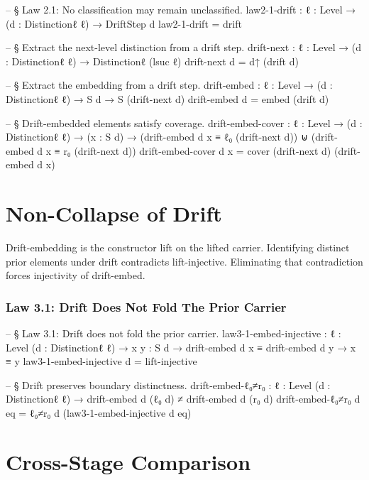 \documentclass[11pt,a4paper]{book}
\def\texttt#1{#1}%
\begin{document}
\begin{code}
-- § Law 2.1: No classification may remain unclassified.
law2-1-drift : {ℓ : Level} → (d : Distinctionℓ ℓ) → DriftStep d
law2-1-drift = drift

-- § Extract the next-level distinction from a drift step.
drift-next : {ℓ : Level} → (d : Distinctionℓ ℓ) → Distinctionℓ (lsuc ℓ)
drift-next d = d↑ (drift d)

-- § Extract the embedding from a drift step.
drift-embed : {ℓ : Level} → (d : Distinctionℓ ℓ) → S d → S (drift-next d)
drift-embed d = embed (drift d)

-- § Drift-embedded elements satisfy coverage.
drift-embed-cover : {ℓ : Level} → (d : Distinctionℓ ℓ) → (x : S d)
                 → (drift-embed d x ≡ ℓ₀ (drift-next d)) ⊎ (drift-embed d x ≡ r₀ (drift-next d))
drift-embed-cover d x = cover (drift-next d) (drift-embed d x)
\end{code}

\chapter{Non-Collapse of Drift}

Drift-embedding is the constructor \texttt{lift} on the lifted carrier. Identifying distinct prior elements under drift contradicts \texttt{lift-injective}. Eliminating that contradiction forces injectivity of \texttt{drift-embed}.

\subsection{Law 3.1: Drift Does Not Fold The Prior Carrier}

\begin{code}
-- § Law 3.1: Drift does not fold the prior carrier.
law3-1-embed-injective :
  {ℓ : Level} (d : Distinctionℓ ℓ) → {x y : S d} →
  drift-embed d x ≡ drift-embed d y → x ≡ y
law3-1-embed-injective d = lift-injective

-- § Drift preserves boundary distinctness.
drift-embed-ℓ₀≠r₀ :
  {ℓ : Level} (d : Distinctionℓ ℓ) →
  drift-embed d (ℓ₀ d) ≠ drift-embed d (r₀ d)
drift-embed-ℓ₀≠r₀ d eq = ℓ₀≠r₀ d (law3-1-embed-injective d eq)
\end{code}

\chapter{Cross-Stage Comparison}
\end{document}
